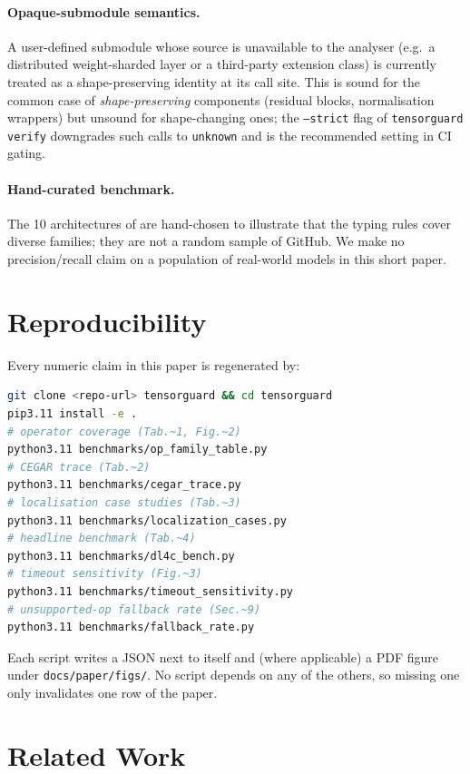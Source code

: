 \documentclass{article}
\theoremstyle{plain}
\theoremstyle{definition}
\newcommand{\code}[1]{\texttt{\small #1}}
\begin{document}
\paragraph{Opaque-submodule semantics.}
A user-defined submodule whose source is unavailable to the
analyser (e.g.\ a distributed weight-sharded layer or a third-party
extension class) is currently treated as a shape-preserving
identity at its call site.  This is sound for the common case of
\emph{shape-preserving} components (residual blocks, normalisation
wrappers) but unsound for shape-changing ones; the \code{--strict}
flag of \code{tensorguard verify} downgrades such calls to
\code{unknown} and is the recommended setting in CI gating.

\paragraph{Hand-curated benchmark.}
The 10 architectures of  are hand-chosen to
illustrate that the typing rules cover diverse families; they are
not a random sample of GitHub.  We make no precision/recall claim
on a population of real-world models in this short paper.

\section{Reproducibility}\label{sec:repro}

Every numeric claim in this paper is regenerated by:
\begin{lstlisting}[language=bash]
git clone <repo-url> tensorguard && cd tensorguard
pip3.11 install -e .
# operator coverage (Tab.~1, Fig.~2)
python3.11 benchmarks/op_family_table.py
# CEGAR trace (Tab.~2)
python3.11 benchmarks/cegar_trace.py
# localisation case studies (Tab.~3)
python3.11 benchmarks/localization_cases.py
# headline benchmark (Tab.~4)
python3.11 benchmarks/dl4c_bench.py
# timeout sensitivity (Fig.~3)
python3.11 benchmarks/timeout_sensitivity.py
# unsupported-op fallback rate (Sec.~9)
python3.11 benchmarks/fallback_rate.py
\end{lstlisting}
Each script writes a JSON next to itself and (where applicable) a
PDF figure under \code{docs/paper/figs/}.  No script depends on
any of the others, so missing one only invalidates one row of the
paper.

\section{Related Work}\label{sec:related}
\end{document}
